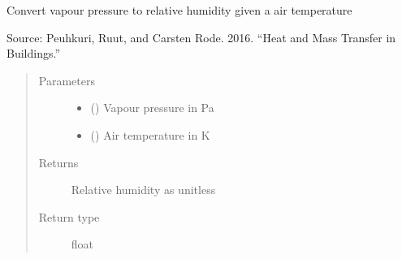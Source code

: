 \documentclass[letterpaper,10pt,english]{sphinxmanual}
\begin{document}
\begin{fulllineitems}
\label{\detokenize{air:livestock.air.vapour_pressure_to_relative_humidity}}
Convert vapour pressure to relative humidity given a air temperature

Source: Peuhkuri, Ruut, and Carsten Rode. 2016.
“Heat and Mass Transfer in Buildings.”
\begin{quote}\begin{description}
\item[{Parameters}] \leavevmode\begin{itemize}
\item {} 
 () \textendash{} Vapour pressure in Pa

\item {} 
 () \textendash{} Air temperature in K

\end{itemize}

\item[{Returns}] \leavevmode
Relative humidity as unitless

\item[{Return type}] \leavevmode
float

\end{description}\end{quote}

\end{fulllineitems}

\end{document}
